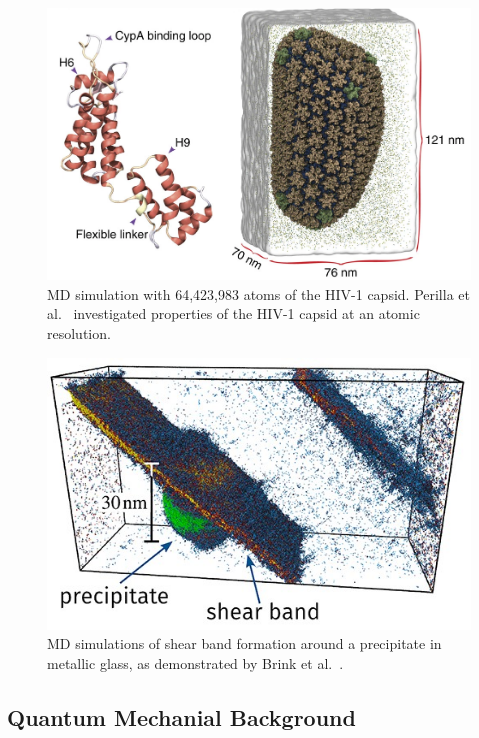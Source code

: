 \begin{multicols*}{2}
      \begin{figure}[H]
            \centering
            \includegraphics[width=0.9\columnwidth, trim={0cm 0 0cm 0cm}]{figures/Intro/HIV-1.png}
            \caption{MD simulation with 64,423,983 atoms of the HIV-1 capsid. Perilla et al.~\cite{Perilla2017} investigated properties of the HIV-1 capsid at an atomic resolution.}
            \label{fig:hiv_capsid}
      \end{figure}

      \begin{figure}[H]
            \centering
            \includegraphics[width=0.9\columnwidth,trim={0cm 0 0cm 0cm}]{figures/Intro/metallic-glass-crack.jpg}
            \caption{MD simulations of shear band formation around a precipitate in metallic glass, as demonstrated by Brink et al.~\cite{Brink2016}.}
            \label{fig:md_simulation_loop}
      \end{figure}
\end{multicols*}

\subsection{Quantum Mechanial Background}

